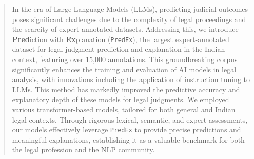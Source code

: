 \begin{abstract}
In the era of Large Language Models (LLMs), predicting judicial outcomes poses significant challenges due to the complexity of legal proceedings and the scarcity of expert-annotated datasets. Addressing this, we introduce \textbf{Pred}iction with \textbf{Ex}planation (\texttt{PredEx}), the largest expert-annotated dataset for legal judgment prediction and explanation in the Indian context, featuring over 15,000 annotations. This groundbreaking corpus significantly enhances the training and evaluation of AI models in legal analysis, with innovations including the application of instruction tuning to LLMs. This method has markedly improved the predictive accuracy and explanatory depth of these models for legal judgments. We employed various transformer-based models, tailored for both general and Indian legal contexts. Through rigorous lexical, semantic, and expert assessments, our models effectively leverage \texttt{PredEx} to provide precise predictions and meaningful explanations, establishing it as a valuable benchmark for both the legal profession and the NLP community.
\end{abstract}

